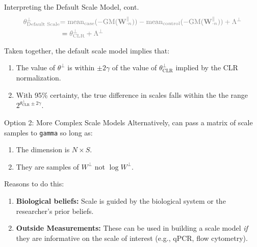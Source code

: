 \documentclass[
  ignorenonframetext,
]{beamer}
\providecommand{\tightlist}{%
  \setlength{\itemsep}{0pt}\setlength{\parskip}{0pt}}
\begin{document}
\begin{frame}{Interpreting the Default Scale Model, cont.}
\protect\hypertarget{interpreting-the-default-scale-model-cont.-2}{}
\begin{align*}
\textcolor{gray}{\theta^\perp_{\text{Default Scale}}} &\textcolor{gray}{= \text{mean}_{\text{case}}(-\text{GM}( \mathbf{W}_{\cdot n}^\parallel)) - \text{mean}_{\text{control}}(-\text{GM}( \mathbf{W}_{\cdot n}^\parallel)) + \Lambda^\perp}\\
&= \textcolor{gray}{\theta^\perp_{\text{CLR}} + \Lambda^\perp}
\end{align*}

Taken together, the default scale model implies that:

\vspace{.1in}

\begin{enumerate}
\item
  The value of \(\theta^\perp\) is within \(\pm 2 \gamma\) of the value
  of \(\theta^\perp_{\text{CLR}}\) implied by the CLR normalization.
\item
  With 95\% certainty, the true difference in scales falls within the
  the range \(2^{\theta_{\text{CLR}}^\perp \pm 2 \gamma}\).
\end{enumerate}
\end{frame}

\begin{frame}[fragile]{Option 2: More Complex Scale Models}
\protect\hypertarget{option-2-more-complex-scale-models}{}
Alternatively, can pass a matrix of scale samples to \texttt{gamma} so
long as:

\begin{enumerate}
\tightlist
\item
  The dimension is \(N \times S\).
\item
  They are samples of \(W^\perp\) not \(\log W^\perp\).
\end{enumerate}

Reasons to do this:

\begin{enumerate}
\item
  \textbf{Biological beliefs:} Scale is guided by the biological system
  or the researcher's prior beliefs.
\item
  \textbf{Outside Measurements:} These can be used in building a scale
  model \emph{if} they are informative on the scale of interest (e.g.,
  qPCR, flow cytometry).
\end{enumerate}
\end{frame}
\end{document}
